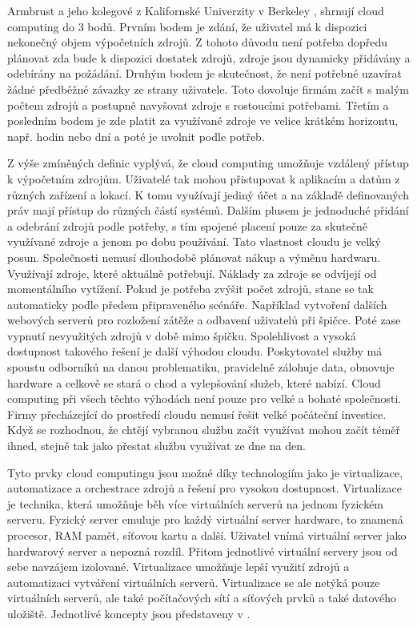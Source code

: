     Armbrust a jeho kolegové z Kalifornské Univerzity v Berkeley \cite{Ambrust2009}, shrnují cloud computing do 3 bodů. Prvním bodem je zdání, že uživatel má k dispozici nekonečný objem výpočetních zdrojů. Z tohoto důvodu není potřeba dopředu plánovat zda bude k dispozici dostatek zdrojů, zdroje jsou dynamicky přidávány a odebírány na požádání. Druhým bodem je skutečnost, že není potřebné uzavírat žádné předběžné závazky ze strany uživatele. Toto dovoluje firmám začít s malým počtem zdrojů a postupně navyšovat zdroje s rostoucími potřebami. Třetím a posledním bodem je zde platit za využívané zdroje ve velice krátkém horizontu, např. hodin nebo dní a poté je uvolnit podle potřeb. \par

    Z výše zmíněných definic vyplývá, že cloud computing umožňuje vzdálený přístup k výpočetním zdrojům. Uživatelé tak mohou přistupovat k aplikacím a datům z různých zařízení a lokací. K tomu využívají jediný účet a na základě definovaných práv mají přístup do různých částí systémů. Dalším plusem je jednoduché přidání a odebrání zdrojů podle potřeby, s tím spojené placení pouze za skutečně využívané zdroje a jenom po dobu používání. Tato vlastnost cloudu je velký posun. Společnosti nemusí dlouhodobě plánovat nákup a výměnu hardwaru. Využívají zdroje, které aktuálně potřebují. Náklady za zdroje se odvíjejí od momentálního vytížení. Pokud je potřeba zvýšit počet zdrojů, stane se tak automaticky podle předem připraveného scénáře. Například vytvoření dalších webových serverů pro rozložení zátěže a odbavení uživatelů při špičce. Poté zase vypnutí nevyužitých zdrojů v době mimo špičku.  Spolehlivost a vysoká dostupnost takového řešení je další výhodou cloudu. Poskytovatel služby má spoustu odborníků na danou problematiku, pravidelně zálohuje data, obnovuje hardware a celkově se stará o chod a vylepšování služeb, které nabízí. Cloud computing při všech těchto výhodách není pouze pro velké a bohaté společnosti. Firmy přecházející do prostředí cloudu nemusí řešit velké počáteční investice. Když se rozhodnou, že chtějí vybranou službu začít využívat mohou začít téměř ihned, stejně tak jako přestat službu využívat ze dne na den.\par
    Tyto prvky cloud computingu jsou možné díky technologiím jako je virtualizace, automatizace a orchestrace zdrojů a řešení pro vysokou dostupnost. Virtualizace je technika, která umožňuje běh více virtuálních serverů na jednom fyzickém serveru. Fyzický server emuluje pro každý virtuální server hardware, to znamená procesor, RAM paměť, síťovou kartu a další. Uživatel vnímá virtuální server jako hardwarový server a nepozná rozdíl. Přitom jednotlivé virtuální servery jsou od sebe navzájem izolované. Virtualizace umožňuje lepší využití zdrojů a automatizaci vytváření virtuálních serverů. Virtualizace se ale netýká pouze virtuálních serverů, ale také počítačových sítí a síťových prvků a také datového uložiště. Jednotlivé koncepty jsou představeny v  \cite{murphy2017virtualization}. \par
